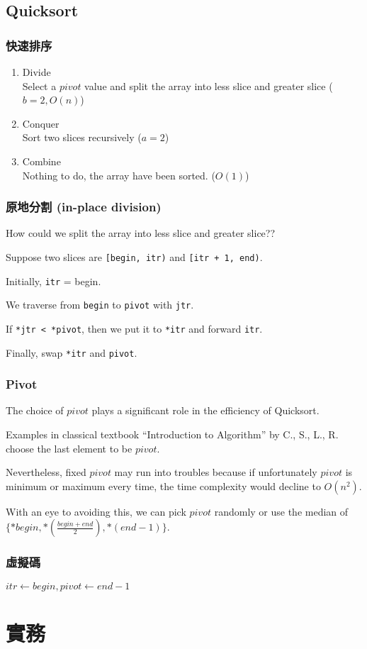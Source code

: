 \documentclass{beamer}
\begin{document}
\subsection{Quicksort}

\frame
{
	\frametitle{快速排序}
	
	\begin{enumerate}
		\item<1-> Divide\\Select a $pivot$ value and split the array into less slice and greater slice ($b = 2, O(n)$)
		\item<2-> Conquer\\Sort two slices recursively ($a = 2$)
		\item<3-> Combine\\Nothing to do, the array have been sorted. ($O(1)$)
	\end{enumerate}
}

\frame
{
	\frametitle{原地分割 (in-place division)}
	
	How could we split the array into less slice and greater slice??\pause
	
	Suppose two slices are \texttt{[begin, itr)} and \texttt{[itr + 1, end)}.\pause
	
	Initially, \texttt{itr} = begin.\pause
	
	We traverse from \texttt{begin} to \texttt{pivot} with \texttt{jtr}.\pause
	
	If \texttt{*jtr < *pivot}, then we put it to \texttt{*itr} and forward \texttt{itr}.\pause
	
	Finally, swap \texttt{*itr} and \texttt{pivot}.
}

\frame
{
	\frametitle{Pivot}
	
	The choice of $pivot$ plays a significant role in the efficiency of Quicksort.\pause
	
	Examples in classical textbook ``Introduction to Algorithm'' by C., S., L., R. choose the last element to be $pivot$.\pause
	
	Nevertheless, fixed $pivot$ may run into troubles because if unfortunately $pivot$ is minimum or maximum every time, the time complexity would decline to $O(n^2)$.\pause
	
	With an eye to avoiding this, we can pick $pivot$ randomly or use the median of $\{*begin, *(\frac{begin+end}{2}), *(end-1)\}$.
}

\frame
{
	\frametitle{虛擬碼}
	
	\begin{algorithmic}
			\pause
				\State\Return
			\EndIf
			\pause
            \State$itr\gets begin, pivot\gets end-1$
                    \State{}
                \EndIf
            \EndFor
            \State{}
            \pause
            \State{}
            \State{}
            \pause
            \State{}
        \EndProcedure
	\end{algorithmic}
}

\section{實務}
\end{document}
